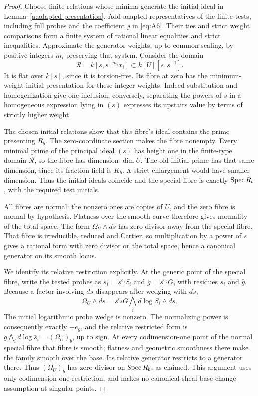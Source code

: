 \begin{proof}
Choose finite relations whose minima generate the initial ideal in
Lemma~\ref{a:adapted-presentation}. Add adapted representatives of the
finite tests, including full probes and the coefficient \(g\) in
\eqref{eq:A6}. Their ties and strict weight comparisons form a finite
system of rational linear equalities and strict inequalities. Approximate
the generator weights, up to common scaling, by positive integers
\(m_i\) preserving that system. Consider the domain
\[
             \mathcal R=k[s,s^{-m_i}x_i]
                    \subset k[U][s,s^{-1}].
\]
It is flat over \(k[s]\), since it is torsion-free. Its fibre at zero
has the minimum-weight initial presentation for these integer weights.
Indeed substitution and homogenization give one inclusion; conversely,
separating the powers of \(s\) in a homogeneous expression lying in
\((s)\) expresses its upstairs value by terms of strictly higher weight.

The chosen initial relations show that this fibre's ideal contains the
prime presenting \(R_b\). The zero-coordinate section makes the fibre
nonempty. Every minimal prime of the principal ideal \((s)\) has height
one in the finite-type domain \(\mathcal R\), so the fibre has dimension
\(\dim U\). The old initial prime has that same dimension, since its
fraction field is \(K_b\). A strict enlargement would have smaller
dimension. Thus the initial ideals coincide and the special fibre is
exactly \(\operatorname{Spec} R_b\), with the required test initials.

All fibres are normal: the nonzero ones are copies of \(U\), and the
zero fibre is normal by hypothesis. Flatness over the smooth curve
therefore gives normality of the total space. The form
\(\Omega_U\wedge ds\) has zero divisor away from the special fibre.
That fibre is irreducible, reduced and Cartier, so multiplication by a
power of \(s\) gives a rational form with zero divisor on the total
space, hence a canonical generator on its smooth locus.

We identify its relative restriction explicitly. At the generic point
of the special fibre, write the tested probes as
\(s_i=s^{e_i}S_i\) and \(g=s^{e_g}G\), with residues
\(\bar s_i\) and \(\bar g\). Because a factor involving \(ds\)
disappears after wedging with \(ds\),
\[
 \Omega_U\wedge ds
       =s^{e_g}G\bigwedge_i d\log S_i\wedge ds.
\]
The initial logarithmic probe wedge is nonzero. The normalizing power
is consequently exactly \(-e_g\), and the relative restricted form is
\(\bar g\bigwedge_i d\log\bar s_i=(\Omega_U)_b\), up to sign.
At every codimension-one point of the normal special fibre that fibre
is smooth; flatness and geometric smoothness there make the family
smooth over the base. Its relative generator restricts to a generator
there. Thus \((\Omega_U)_b\) has zero divisor on \(\operatorname{Spec} R_b\), as
claimed. This argument uses only codimension-one restriction, and makes
no canonical-sheaf base-change assumption at singular points.
\end{proof}

